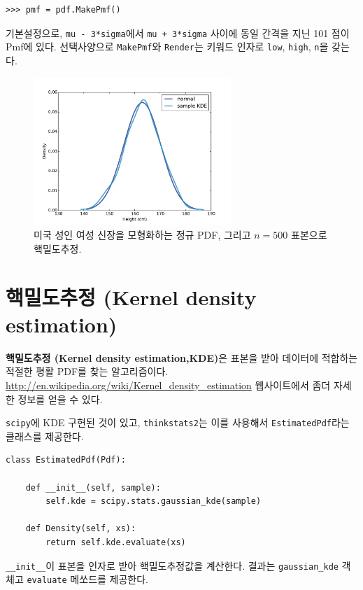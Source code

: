 \begin{verbatim}
>>> pmf = pdf.MakePmf()
\end{verbatim}

기본설정으로, {\tt mu - 3*sigma}에서 {\tt mu + 3*sigma} 사이에 동일 간격을 지닌 101 점이 Pmf에 있다.
선택사양으로 {\tt MakePmf}와 {\tt Render}는 키워드 인자로 {\tt low}, {\tt high}, {\tt n}을 갖는다.

\begin{figure}
\centerline{\includegraphics[height=2.2in]{figs/pdf_example.pdf}}
\caption{미국 성인 여성 신장을 모형화하는 정규 PDF, 그리고 $n=500$ 표본으로 핵밀도추정.}
\label{pdf_example}
\end{figure}


\section{핵밀도추정 (Kernel density estimation)} 

{\bf 핵밀도추정 (Kernel density estimation,KDE)}은
표본을 받아 데이터에 적합하는 적절한 평활 PDF를 찾는 알고리즘이다.
\url{http://en.wikipedia.org/wiki/Kernel_density_estimation}  웹사이트에서 좀더 자세한 정보를 얻을 수 있다.


{\tt scipy}에 KDE 구현된 것이 있고, 
{\tt thinkstats2}는 이를 사용해서 {\tt EstimatedPdf}라는 클래스를 제공한다.

\begin{verbatim}
class EstimatedPdf(Pdf):

    def __init__(self, sample):
        self.kde = scipy.stats.gaussian_kde(sample)

    def Density(self, xs):
        return self.kde.evaluate(xs)
\end{verbatim}

\verb"__init__"이 표본을 인자로 받아 핵밀도추정값을 계산한다.
결과는 \verb"gaussian_kde" 객체고 {\tt evaluate} 메쏘드를 제공한다.

